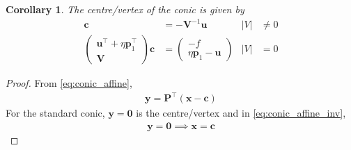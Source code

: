 \documentclass[]{interact}
\theoremstyle{plain}%
\newtheorem{corollary}[theorem]{Corollary}
\theoremstyle{definition}
\theoremstyle{remark}
\providecommand{\abs}[1]{\lvert#1\rvert}
\providecommand{\brak}[1]{\ensuremath{\left(#1\right)}}
\newcommand{\myvec}[1]{\ensuremath{\begin{pmatrix}#1\end{pmatrix}}}
\let\vec\mathbf
\begin{document}
\begin{corollary}
  The centre/vertex of the conic is given by 
  \begin{align}
    \label{eq:conic_nonparab_c}
    \vec{c} &= - \vec{V}^{-1}\vec{u} & \abs{V} &\ne 0
    \\
    \myvec{ \vec{u}^{\top}+\eta\vec{p}_1^{\top} \\ \vec{V}}\vec{c} &= \myvec{-f \\ \eta\vec{p}_1-\vec{u}}  &\abs{V} &= 0
    \label{eq:conic_parab_c}
    \end{align}
\end{corollary}
\begin{proof}
From \eqref{eq:conic_affine},
\begin{align}
\label{eq:conic_affine_inv}
\vec{y} = \vec{P}^{\top}\brak{\vec{x}-\vec{c}}
\end{align}
For the standard conic, $\vec{y} = \vec{0} $ is the centre/vertex and in \eqref{eq:conic_affine_inv}, 
\begin{align}
\label{eq:conic_centre}
\vec{y} = \vec{0} \implies \vec{x}=\vec{c}
\end{align}
\end{proof}
\end{document}
